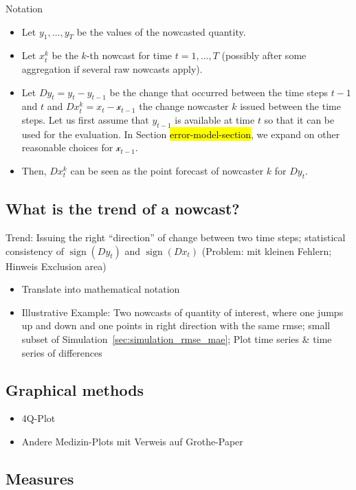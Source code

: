 \documentclass[oneside]{article}
\theoremstyle{plain}%
\theoremstyle{definition}
\DeclareMathOperator{\sign}{sign}
\newcommand{\ydiff}{D y}
\newcommand{\xdiff}{Dx}
\begin{document}
Notation
\begin{itemize}
  \item Let $y_1, \ldots, y_T$ be the values of the nowcasted quantity.
  \item Let $x_t^k$ be the $k$-th nowcast for time $t = 1, \ldots, T$ (possibly after some aggregation if several raw nowcasts apply).
  \item Let $\ydiff_t = y_t - y_{t-1}$ be the change that occurred between the time steps $t-1$ and $t$ and $\xdiff_t^k = x_t - \mathcal{x}_{t-1}$ the change nowcaster $k$ issued between the time steps. Let us first assume that $y_{t-1}$ is available at time $t$ so that it can be used for the evaluation. 
  In Section \hl{error-model-section}, we expand on other reasonable choices for $\mathcal{x}_{t-1}$.
  \item Then, $\xdiff_t^k$ can be seen as the point forecast of nowcaster $k$ for $\ydiff_t$. 
\end{itemize}

\subsection{What is the trend of a nowcast?}

Trend: Issuing the right \enquote{direction} of change between two time steps; statistical consistency of $\sign(\ydiff_t)$ and $\sign(\xdiff_t)$ (Problem: mit kleinen Fehlern; Hinweis Exclusion area)

\begin{itemize}
  \item Translate into mathematical notation
  \item Illustrative Example: Two nowcasts of quantity of interest, where one jumps up and down and one points in right direction with the same rmse; small subset of Simulation~\ref{sec:simulation_rmse_mae}; Plot time series \& time series of differences
\end{itemize}

\subsection{Graphical methods}


\begin{itemize}
  \item 4Q-Plot
  \item Andere Medizin-Plots mit Verweis auf Grothe-Paper
\end{itemize}


\subsection{Measures}
\end{document}
